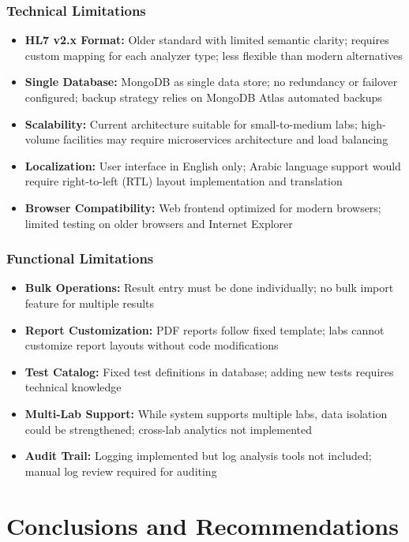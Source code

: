 \documentclass[12pt, a4paper]{report}
\begin{document}
\subsection{Technical Limitations}
\begin{itemize}
    \item \textbf{HL7 v2.x Format:} Older standard with limited semantic clarity; requires custom mapping for each analyzer type; less flexible than modern alternatives
    \item \textbf{Single Database:} MongoDB as single data store; no redundancy or failover configured; backup strategy relies on MongoDB Atlas automated backups
    \item \textbf{Scalability:} Current architecture suitable for small-to-medium labs; high-volume facilities may require microservices architecture and load balancing
    \item \textbf{Localization:} User interface in English only; Arabic language support would require right-to-left (RTL) layout implementation and translation
    \item \textbf{Browser Compatibility:} Web frontend optimized for modern browsers; limited testing on older browsers and Internet Explorer
\end{itemize}

\subsection{Functional Limitations}
\begin{itemize}
    \item \textbf{Bulk Operations:} Result entry must be done individually; no bulk import feature for multiple results
    \item \textbf{Report Customization:} PDF reports follow fixed template; labs cannot customize report layouts without code modifications
    \item \textbf{Test Catalog:} Fixed test definitions in database; adding new tests requires technical knowledge
    \item \textbf{Multi-Lab Support:} While system supports multiple labs, data isolation could be strengthened; cross-lab analytics not implemented
    \item \textbf{Audit Trail:} Logging implemented but log analysis tools not included; manual log review required for auditing
\end{itemize}

\chapter{Conclusions and Recommendations}
\end{document}
